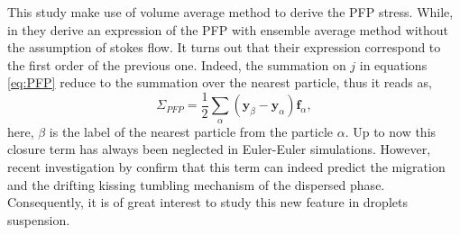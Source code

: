 This study make use of volume average method to derive the PFP stress. 
While, in \citet{zhang2021ensemble} they derive an expression of the PFP with ensemble average method without the assumption of stokes flow.
It turns out that their expression correspond to the first order of the previous one. 
Indeed, the summation on $j$ in equations \ref{eq:PFP} reduce to the summation over the nearest particle, thus it reads as,
\begin{equation}
    \Sigma_{PFP} = \frac{1}{2}  \sum_\alpha (\bm{y}_\beta - \bm{y}_\alpha)\bm{f}_\alpha,
\end{equation}
here, $\beta$ is the label of the nearest particle from the particle $\alpha$. 
Up to now this closure term has always been neglected in Euler-Euler simulations. 
However, recent investigation by \citet{wang2021numerical} confirm that this term can indeed predict the migration and the drifting kissing tumbling mechanism of the dispersed phase.
Consequently, it is of great interest to study this new feature in droplets suspension. 

